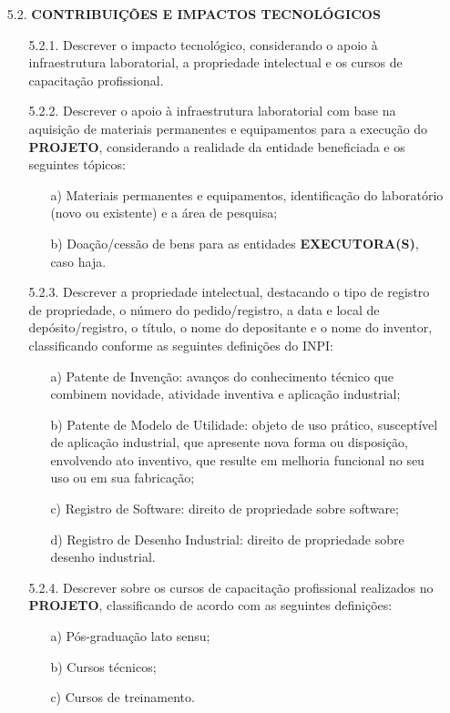 {\begin{lmarginbox}
\begin{enumerate}[leftmargin=1cm, font=\bfseries]
        \item[5.2.]	\textbf{CONTRIBUIÇÕES E IMPACTOS TECNOLÓGICOS}
            \begin{enumerate}[font=\bfseries]
                \item[5.2.1.] Descrever o impacto tecnológico, considerando o apoio à infraestrutura laboratorial, a propriedade intelectual e os cursos de capacitação profissional.
                \item[5.2.2.] Descrever o apoio à infraestrutura laboratorial com base na aquisição de materiais permanentes e equipamentos para a execução do \textbf{PROJETO}, considerando a realidade da entidade beneficiada e os seguintes tópicos:
                    \begin{enumerate}[font=\bfseries]
                        \item[a)] Materiais permanentes e equipamentos, identificação do laboratório (novo ou existente) e a área de pesquisa;
                        \item[b)] Doação/cessão de bens para as entidades \textbf{EXECUTORA(S)}, caso haja.

                    \end{enumerate}
                \item[5.2.3.] Descrever a propriedade intelectual, destacando o tipo de registro de propriedade, o número do pedido/registro, a data e local de depósito/registro, o título, o nome do depositante e o nome do inventor, classificando conforme as seguintes definições do INPI:
                    \begin{enumerate}[font=\bfseries]
                        \item[a)] Patente de Invenção: avanços do conhecimento técnico que combinem novidade, atividade inventiva e aplicação industrial;
                        \item[b)] Patente de Modelo de Utilidade: objeto de uso prático, susceptível de aplicação industrial, que apresente nova forma ou disposição, envolvendo ato inventivo, que resulte em melhoria funcional no seu uso ou em sua fabricação;
                        \item[c)] Registro de Software: direito de propriedade sobre software;
                        \item[d)] Registro de Desenho Industrial: direito de propriedade sobre desenho industrial.
                    \end{enumerate}
                \item[5.2.4.] Descrever sobre os cursos de capacitação profissional realizados no \textbf{PROJETO}, classificando de acordo com as seguintes definições:
                    \begin{enumerate}[font=\bfseries]
                        \item[a)] Pós-graduação lato sensu;
                        \item[b)] Cursos técnicos;
                        \item[c)] Cursos de treinamento.
                    \end{enumerate}


\end{enumerate}
\end{enumerate}
\end{lmarginbox}}
